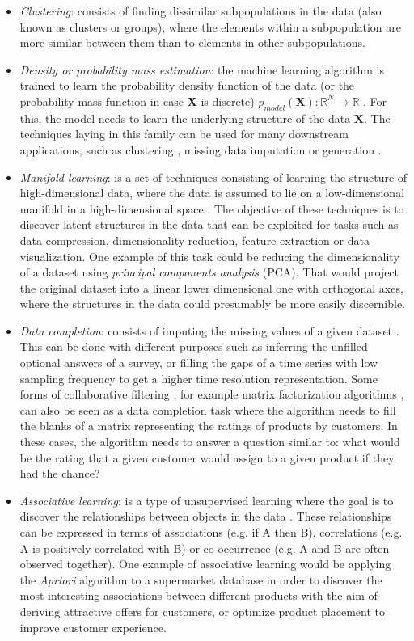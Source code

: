 \begin{itemize}
	\item \textit{Clustering}: consists of finding dissimilar subpopulations in the data (also known as clusters or groups), where the elements within a subpopulation are more similar between them than to elements in other subpopulations.
	\item \textit{Density or probability mass estimation}: the machine learning algorithm is trained to learn the probability density function of the data (or the probability mass function in case $\mathbf{X}$ is discrete) $p_{model}(\textbf{X}): \mathbb{R}^N \rightarrow \mathbb{R}$ \autocite{Goodfellow2016}. For this, the model needs to learn the underlying structure of the data $\mathbf{X}$. The techniques laying in this family can be used for many downstream applications, such as clustering \autocite{wang2006}, missing data imputation \autocite{qichuan2015} or generation \autocite{liu2020a}.
	\item \textit{Manifold learning}: is a set of techniques consisting of learning the structure of high-dimensional data, where the data is assumed to lie on a low-dimensional manifold in a high-dimensional space \autocite{murphy2012}. The objective of these techniques is to discover latent structures in the data that can be exploited for tasks such as data compression, dimensionality reduction, feature extraction or data visualization. One example of this task could be reducing the dimensionality of a dataset using \textit{principal components analysis} (PCA). That would project the original dataset into a linear lower dimensional one with orthogonal axes, where the structures in the data could presumably be more easily discernible.
	\item \textit{Data completion}: consists of imputing the missing values of a given dataset \autocite{vanburen_2018}. This can be done with different purposes such as inferring the unfilled optional answers of a survey, or filling the gaps of a time series with low sampling frequency to get a higher time resolution representation. Some forms of collaborative filtering \autocite{falk2019}, for example matrix factorization algorithms \autocite{koren2009}, can also be seen as a data completion task where the algorithm needs to fill the blanks of a matrix representing the ratings of products by customers. In these cases, the algorithm needs to answer a question similar to: what would be the rating that a given customer would assign to a given product if they had the chance?
	\item \textit{Associative learning}:  is a type of unsupervised learning where the goal is to discover the relationships between objects in the data \autocite{zhang2002}. These relationships can be expressed in terms of associations (e.g. if A then B), correlations (e.g. A is positively correlated with B) or co-occurrence (e.g. A and B are often observed together). One example of associative learning would be applying the \textit{Apriori} algorithm \autocite{agrawal1996} to a supermarket database in order to discover the most interesting associations between different products with the aim of deriving attractive offers for customers, or optimize product placement to improve customer experience. 

\end{itemize}
